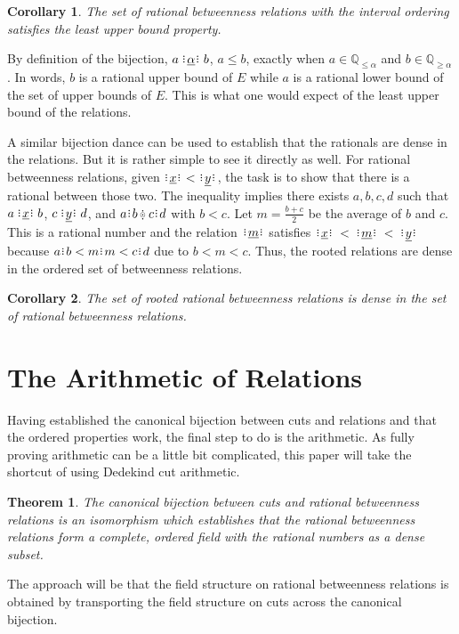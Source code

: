\documentclass[12pt]{article}
\newtheorem{corollary}{Corollary}[section]
\newtheorem{theorem}{Theorem}
\newcommand{\qcut}[2][x]{\ensuremath{\mathbb{Q}_{#2 #1}}}
\newcommand{\qgeq}[1][x]{\qcut[#1]{\geq}}
\newcommand{\qleq}[1][x]{\qcut[#1]{\leq}}
\newcommand{\yrel}{\xrel[y]}
\begin{document}
\begin{corollary}
    The set of rational betweenness relations with the interval ordering satisfies the least upper bound property. 
\end{corollary}

By definition of the bijection, $a \xrel[\alpha] b$, $a \leq b$, exactly when $a \in \qleq [\alpha]$ and $b \in \qgeq[\alpha]$. In words, $b$ is a rational upper bound of $E$ while $a$ is a rational lower bound of the set of upper bounds of $E$. This is what one would expect of the least upper bound of the relations. 

A similar bijection dance can be used to establish that the rationals are dense in the relations. But it is rather simple to see it directly as well. For rational betweenness relations, given $\xrel < \yrel$, the task is to show that there is a rational between those two. The inequality implies there exists $a,b,c,d$ such that $a \xrel b$, $c \xrel[y] d$, and $a \rint b \betneq c\rint d$ with $b < c$. Let $m = \frac{b+c}{2}$ be the average of $b$ and $c$. This is a rational number and the relation $\xrel[m]$ satisfies $\xrel  \:<\: \xrel[m]  \:<\: \xrel[y]$ because $a \rint b < m\rint m < c\rint d$ due to $b < m < c$. Thus, the rooted relations are dense in the ordered set of betweenness relations. 

\begin{corollary}
    The set of rooted rational betweenness relations is dense in the set of rational betweenness relations.
\end{corollary}
 

\section{The Arithmetic of Relations}

Having established the canonical bijection between cuts and relations and that the ordered properties work, the final step to do is the arithmetic. As fully proving arithmetic can be a little bit complicated, this paper will take the shortcut of using Dedekind cut arithmetic.

\begin{theorem}
The canonical bijection between cuts and rational betweenness relations is an isomorphism which establishes that the rational betweenness relations form a complete, ordered field with the rational numbers as a dense subset. 
\end{theorem}


The approach will be that the field structure on rational betweenness relations is obtained by transporting the field structure on cuts across the canonical bijection.
\end{document}

